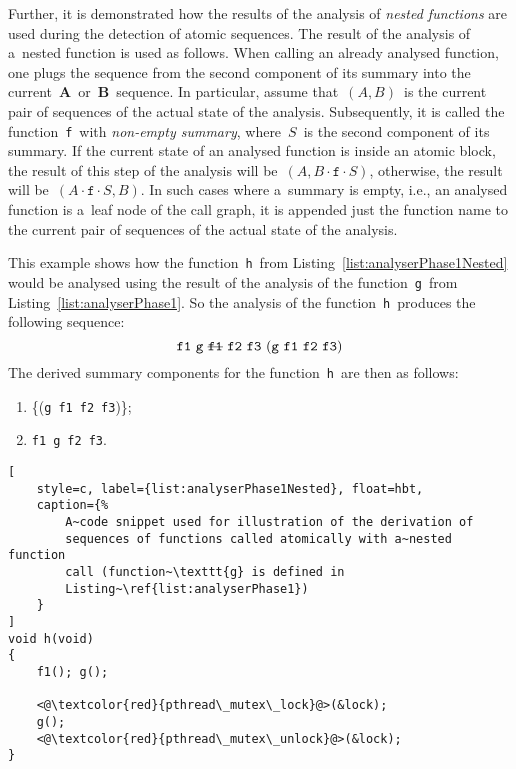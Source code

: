 Further, it is demonstrated how the results of the analysis of \emph{nested
functions} are used during the detection of atomic sequences. The
result of the analysis of a~nested function is used as follows. When
calling an already analysed function, one plugs the sequence from the
second component of its summary into the
current~\textbf{A}~or~\textbf{B}~sequence. In particular, assume 
that~$ (A, B) $~is the current pair of sequences of the actual state of 
the analysis. Subsequently, it is called the function~\texttt{f}~with
\emph{non-empty summary}, where~$ S $~is the second component of its 
summary. If the current state of an analysed function is inside an
atomic block, the result of this step of the analysis will 
be~$ (A, B\cdot\mathtt{f}{\cdot}S) $, otherwise, the result will 
be~$ (A\cdot\mathtt{f}{\cdot}S, B) $. In such cases where a~summary
is empty, i.e., an analysed function is a~leaf node of the call
graph, it is appended just the function name to the current pair of
sequences of the actual state of the analysis.

\begin{example}
    This example shows how the function~\texttt{h}~from
    Listing~\ref{list:analyserPhase1Nested} would be analysed using the
    result of the analysis of the function~\texttt{g}~from
    Listing~\ref{list:analyserPhase1}. So the analysis of the
    function~\texttt{h}~produces the following sequence:
    $$
        \text{%
            \texttt{f1}~\texttt{g}~\sout{\texttt{f1}}~\texttt{f2}~\texttt{f3}
        }
        (\text{%
            \texttt{g}~\texttt{f1}~\texttt{f2}~\texttt{f3}%
        })
    $$
    The derived summary components for the function~\texttt{h}~are then as
    follows:
    \begin{enumerate}[label={(\roman*)}]
        \item
            \{(\texttt{g}~\texttt{f1}~\texttt{f2}~\texttt{f3})\};

        \item
            \texttt{f1}~\texttt{g}~\texttt{f2}~\texttt{f3}.
    \end{enumerate}
\end{example}

\begin{lstlisting}[
    style=c, label={list:analyserPhase1Nested}, float=hbt,
    caption={%
        A~code snippet used for illustration of the derivation of
        sequences of functions called atomically with a~nested function
        call (function~\texttt{g} is defined in
        Listing~\ref{list:analyserPhase1})
    }
]
void h(void)
{
    f1(); g();

    <@\textcolor{red}{pthread\_mutex\_lock}@>(&lock);
    g();
    <@\textcolor{red}{pthread\_mutex\_unlock}@>(&lock);
}
\end{lstlisting}

